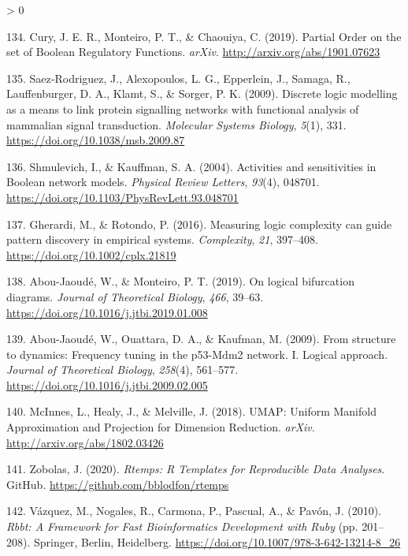 \documentclass[
  12pt,
]{book}
\newlength{\cslhangindent}
\newenvironment{CSLReferences}[2] %
 {%
  \setlength{\parindent}{0pt}
  \ifodd #1 \everypar{\setlength{\hangindent}{\cslhangindent}}\ignorespaces\fi
  \ifnum #2 > 0
  \setlength{\parskip}{#2\baselineskip}
  \fi
 }%
 {}
\begin{document}
\begin{CSLReferences}{1}{0}
\leavevmode\hypertarget{ref-Cury2019}{}%
134. Cury, J. E. R., Monteiro, P. T., \& Chaouiya, C. (2019). {Partial Order on the set of Boolean Regulatory Functions}. \emph{arXiv}. \url{http://arxiv.org/abs/1901.07623}

\leavevmode\hypertarget{ref-Saez-Rodriguez2009}{}%
135. Saez‐Rodriguez, J., Alexopoulos, L. G., Epperlein, J., Samaga, R., Lauffenburger, D. A., Klamt, S., \& Sorger, P. K. (2009). {Discrete logic modelling as a means to link protein signalling networks with functional analysis of mammalian signal transduction}. \emph{Molecular Systems Biology}, \emph{5}(1), 331. \url{https://doi.org/10.1038/msb.2009.87}

\leavevmode\hypertarget{ref-Shmulevich2004}{}%
136. Shmulevich, I., \& Kauffman, S. A. (2004). {Activities and sensitivities in Boolean network models}. \emph{Physical Review Letters}, \emph{93}(4), 048701. \url{https://doi.org/10.1103/PhysRevLett.93.048701}

\leavevmode\hypertarget{ref-Gherardi2016}{}%
137. Gherardi, M., \& Rotondo, P. (2016). {Measuring logic complexity can guide pattern discovery in empirical systems}. \emph{Complexity}, \emph{21}, 397--408. \url{https://doi.org/10.1002/cplx.21819}

\leavevmode\hypertarget{ref-Abou-Jaoude2019}{}%
138. Abou-Jaoudé, W., \& Monteiro, P. T. (2019). {On logical bifurcation diagrams}. \emph{Journal of Theoretical Biology}, \emph{466}, 39--63. \url{https://doi.org/10.1016/j.jtbi.2019.01.008}

\leavevmode\hypertarget{ref-Abou-Jaoude2009}{}%
139. Abou-Jaoudé, W., Ouattara, D. A., \& Kaufman, M. (2009). {From structure to dynamics: Frequency tuning in the p53-Mdm2 network. I. Logical approach}. \emph{Journal of Theoretical Biology}, \emph{258}(4), 561--577. \url{https://doi.org/10.1016/j.jtbi.2009.02.005}

\leavevmode\hypertarget{ref-McInnes2018}{}%
140. McInnes, L., Healy, J., \& Melville, J. (2018). {UMAP: Uniform Manifold Approximation and Projection for Dimension Reduction}. \emph{arXiv}. \url{http://arxiv.org/abs/1802.03426}

\leavevmode\hypertarget{ref-rtemps}{}%
141. Zobolas, J. (2020). \emph{{Rtemps: R Templates for Reproducible Data Analyses}}. GitHub. \url{https://github.com/bblodfon/rtemps}

\leavevmode\hypertarget{ref-Vazquez2010}{}%
142. Vázquez, M., Nogales, R., Carmona, P., Pascual, A., \& Pavón, J. (2010). \emph{{Rbbt: A Framework for Fast Bioinformatics Development with Ruby}} (pp. 201--208). Springer, Berlin, Heidelberg. \url{https://doi.org/10.1007/978-3-642-13214-8_26}

\end{CSLReferences}
\end{document}
